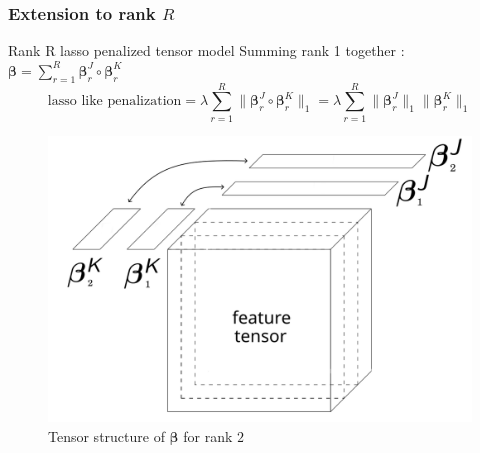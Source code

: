 \documentclass{beamer}
\begin{document}
\begin{frame}
    \frametitle{Extension to rank $R$ \cite{multi_rank_r}}
    \begin{block}{Rank R lasso penalized tensor model}
    \hspace{50 pt}Summing rank 1 together : $\bm{\beta} = \sum\limits_{r = 1}^R \bm{\beta}_{r}^J \circ \bm{\beta}_{r}^K$\\[-10 pt]
    $$ \text{lasso like penalization} =\lambda \sum\limits_{r = 1}^R  \lVert \bm{\beta}_r^J \circ \bm{\beta}_r^K \rVert_1  =  \lambda \sum\limits_{r = 1}^R\lVert \bm{\beta}_r^J \rVert_1 \lVert \bm{\beta}_r^K \rVert_1 $$
    \end{block}
    \vspace{-10 pt}
\begin{figure}
        \centering
        \includegraphics[scale=0.19]{images/beta_tens_R.png}
        \caption{Tensor structure of $\bm{\beta}$ for rank $2$}

\end{figure}

\end{frame}
\end{document}
